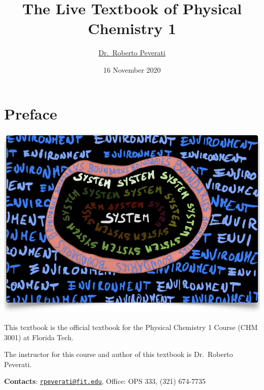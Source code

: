 \documentclass[
  9pt,
]{extbook}
\title{The Live Textbook of Physical Chemistry 1}
\author{\href{mailto:rpeverati@fit.edu}{Dr.~Roberto Peverati}}
\date{16 November 2020}
\let\oldmaketitle\maketitle
\theoremstyle{definition}
\theoremstyle{definition}
\theoremstyle{definition}
\theoremstyle{remark}
\begin{document}
\maketitle


%
\newpage

\let\maketitle\oldmaketitle

\renewcommand\thepage{\romannumeral\numexpr\value{page}-1\relax}


{
\setcounter{tocdepth}{1}
\tableofcontents
}
\renewcommand{\arraystretch}{1.8}

\hypertarget{preface}{%
\chapter*{Preface}\label{preface}}

\begin{center}\includegraphics[width=0.8\linewidth]{./img/OEP_Figures.000} \end{center}

This textbook is the official textbook for the Physical Chemistry 1 Course (CHM 3001) at Florida Tech.

The instructor for this course and author of this textbook is Dr.~Roberto Peverati.

\textbf{Contacts}: \href{mailto:rpeverati@fit.edu}{\nolinkurl{rpeverati@fit.edu}}, Office: OPS 333, (321) 674-7735
\end{document}
